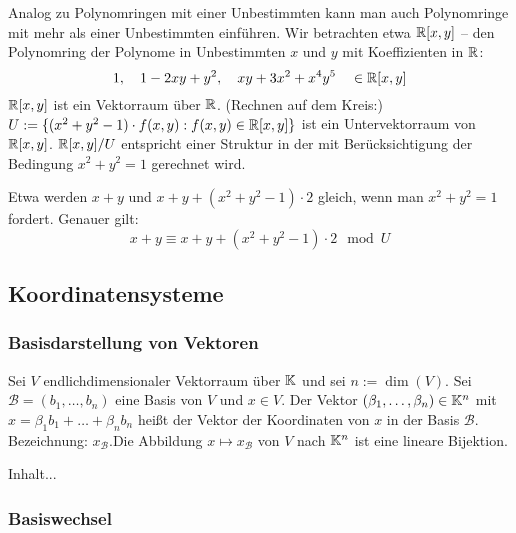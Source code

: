 \begin{bsp}
	Analog zu Polynomringen mit einer Unbestimmten kann man auch Polynomringe mit mehr als einer Unbestimmten einführen. Wir betrachten etwa $ \mathbb R[x,y] $ -- den Polynomring der Polynome in Unbestimmten $ x $ und $ y $ mit Koeffizienten in $ \mathbb R $:
	\begin{equation*}
		1, \quad 1 - 2xy + y^2, \quad xy + 3x^2 + x^4y^5 \quad \in \mathbb R[x,y]
	\end{equation*}
	$ \mathbb R[x,y] $ ist ein Vektorraum über $ \mathbb R $. (Rechnen auf dem Kreis:) $ U := \{ (x^2+y^2-1) \cdot f(x,y) : f(x,y) \in \mathbb R[x,y] \} $ ist ein Untervektorraum von $ \mathbb R[x,y] $. $ \mathbb R[x,y]/U $ entspricht einer Struktur in der mit Berücksichtigung der Bedingung $ x^2 + y^2 = 1 $ gerechnet wird.
	
	Etwa werden $ x + y $ und $ x + y + (x^2 + y^2 - 1) \cdot 2 $ gleich, wenn man $ x^2 + y^2 = 1 $ fordert. Genauer gilt:
	\begin{equation*}
		x + y \equiv x + y + (x^2 + y^2 -1) \cdot 2 \mod{U}
	\end{equation*}
\end{bsp}

\clearpage
\subsection{Koordinatensysteme}

\subsubsection{Basisdarstellung von Vektoren}

Sei $ V $ endlichdimensionaler Vektorraum über $ \mathbb K $ und sei $ n := \dim(V) $. Sei $ \mathcal{B} = (b_1, \ldots, b_n) $ eine Basis von $ V $ und $ x \in V $. Der Vektor $ (\beta_1, \ldots, \beta_n) \in \mathbb K^n $ mit $ x = \beta_1b_1 + \ldots + \beta_nb_n $ heißt der Vektor der Koordinaten von $ x $ in der Basis $ \mathcal{B} $. Bezeichnung: $ x_\mathcal{B} $.Die Abbildung $ x \mapsto x_\mathcal{B} $ von $ V $ nach $ \mathbb K^n $ ist eine lineare Bijektion.
\begin{bsp}
Inhalt...
\end{bsp}

\subsubsection{Basiswechsel}

